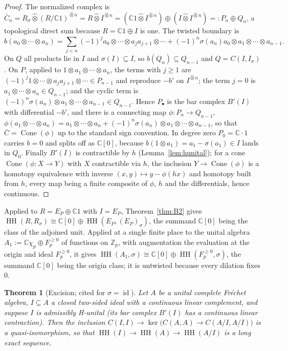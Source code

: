 \documentclass[11pt]{amsart}
\newtheorem{theorem}{Theorem}[section]
\theoremstyle{definition}
\theoremstyle{remark}
\newcommand{\C}{\mathbb C}
\newcommand{\Z}{\mathbb Z}
\newcommand{\Cone}{\operatorname{Cone}}
\newcommand{\id}{\operatorname{id}}
\newcommand{\HH}{\operatorname{HH}}
\begin{document}
\begin{proof}
The normalized complex is
$\bar C_n=R_{\sigma}\widehat\otimes(R/\C1)^{\widehat\otimes n}
=R\widehat\otimes I^{\widehat\otimes n}
=(\C1\widehat\otimes I^{\widehat\otimes n})\oplus
(I\widehat\otimes I^{\widehat\otimes n})=:P_n\oplus Q_n$, a topological direct
sum because $R=\C1\oplus I$ is one.  The twisted boundary is
\[
b(a_0\otimes\cdots\otimes a_n)=\sum_{j<n}(-1)^{j}a_0\otimes\cdots\otimes
a_ja_{j+1}\otimes\cdots+(-1)^{n}\sigma(a_n)a_0\otimes a_1\otimes\cdots\otimes
a_{n-1}.
\]
On $Q$ all products lie in $I$ and $\sigma(I)\subseteq I$, so $b(Q_n)\subseteq Q_{n-1}$ and
$Q=C(I,I_{\sigma})$.  On $P$, applied to $1\otimes a_1\otimes\cdots\otimes
a_n$, the terms with $j\ge1$ are
$(-1)^{j}1\otimes\cdots\otimes a_ja_{j+1}\otimes\cdots\in P_{n-1}$ and
reproduce $-b'$ on $I^{\widehat\otimes n}$; the term $j=0$ is
$a_1\otimes\cdots\otimes a_n\in Q_{n-1}$; and the cyclic term is
$(-1)^{n}\sigma(a_n)\otimes a_1\otimes\cdots\otimes a_{n-1}\in Q_{n-1}$.  Hence
$P_{\bullet}$ is the bar complex $B'(I)$ with differential $-b'$, and there is
a connecting map $\phi:P_n\to Q_{n-1}$,
$\phi(a_1\otimes\cdots\otimes a_n)=a_1\otimes\cdots\otimes a_n+
(-1)^{n}\sigma(a_n)\otimes a_1\otimes\cdots\otimes a_{n-1}$, so that
$\bar C=\Cone(\phi)$ up to the standard sign convention.  In degree zero
$P_0=\C\cdot1$ carries $b=0$ and splits off as $\C[0]$, because
$b(1\otimes a_1)=a_1-\sigma(a_1)\in I$ lands in $Q_0$.  Finally $B'(I)$ is
contractible by $h$ (Lemma~\ref{lem:hunital}); for a cone $\Cone(\phi:X\to Y)$
with $X$ contractible via $h$, the inclusion $Y\to\Cone(\phi)$ is a homotopy
equivalence with inverse $(x,y)\mapsto y-\phi(hx)$ and homotopy built from $h$,
every map being a finite composite of $\phi$, $h$ and the differentials, hence
continuous.
\end{proof}

Applied to $R=E_P\oplus\C1$ with $I=E_P$, Theorem~\ref{thm:B2} gives
$\HH(R,R_{\sigma})\cong\C[0]\oplus\HH(E_P,(E_P)_{\sigma})$, the summand $\C[0]$
being the class of the adjoined unit.  Applied at a single finite place to the
unital algebra $A_1:=\C\chi_p\oplus F_p^{\ge0}$ of functions on $\Z_p$, with
augmentation the evaluation at the origin and ideal $F_p^{\ge0}$, it gives
$\HH(A_1,\sigma)\cong\C[0]\oplus\HH(F_p^{\ge0},\sigma)$, the summand $\C[0]$
being the origin class; it is untwisted because every dilation fixes $0$.

\begin{theorem}[Excision; cited for $\sigma=\id$]\label{thm:excision-input}
Let $A$ be a unital complete Fr\'echet algebra, $I\subseteq A$ a closed
two-sided ideal with a continuous linear complement, and suppose $I$ is
admissibly H-unital (its bar complex $B'(I)$ has a continuous linear
contraction).  Then the inclusion $C(I,I)\to\ker\bigl(C(A,A)\to
C(A/I,A/I)\bigr)$ is a quasi-isomorphism, so that
$\HH(I)\to\HH(A)\to\HH(A/I)$ is a long exact sequence.
\end{theorem}
\end{document}

